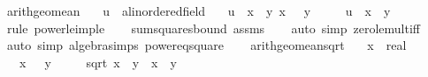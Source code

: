 \begin{isabellebody}
\isanewline
{}\isamarkupfalse%
\ arith{\isacharunderscore}{\kern0pt}geo{\isacharunderscore}{\kern0pt}mean{\isacharcolon}{\kern0pt}\isanewline
\ \ \ u\ {\isacharcolon}{\kern0pt}{\isacharcolon}{\kern0pt}\ {\isachardoublequoteopen}{\isacharprime}{\kern0pt}a{\isacharcolon}{\kern0pt}{\isacharcolon}{\kern0pt}linordered{\isacharunderscore}{\kern0pt}field{\isachardoublequoteclose}\isanewline
\ \ \ {\isachardoublequoteopen}u\ {\isacharequal}{\kern0pt}\ x\ {\isacharasterisk}{\kern0pt}\ y{\isachardoublequoteclose}\ {\isachardoublequoteopen}x\ {\isasymge}\ {}{\isachardoublequoteclose}\ {\isachardoublequoteopen}y\ {\isasymge}\ {}{\isachardoublequoteclose}\isanewline
\ \ \ {\isachardoublequoteopen}u\ {\isasymle}\ {\isacharparenleft}{\kern0pt}x\ {\isacharplus}{\kern0pt}\ y{\isacharparenright}{\kern0pt}{\isacharslash}{\kern0pt}{}{\isachardoublequoteclose}\isanewline
%
\isadelimproof
\ \ %
\endisadelimproof
%
\isatagproof
{}\isamarkupfalse%
\ {\isacharparenleft}{\kern0pt}rule\ power{}{\isacharunderscore}{\kern0pt}le{\isacharunderscore}{\kern0pt}imp{\isacharunderscore}{\kern0pt}le{\isacharparenright}{\kern0pt}\isanewline
\ \ \isamarkupfalse%
\ sum{\isacharunderscore}{\kern0pt}squares{\isacharunderscore}{\kern0pt}bound\ assms\isanewline
\ \ \isamarkupfalse%
\ {\isacharparenleft}{\kern0pt}auto\ simp{\isacharcolon}{\kern0pt}\ zero{\isacharunderscore}{\kern0pt}le{\isacharunderscore}{\kern0pt}mult{\isacharunderscore}{\kern0pt}iff{\isacharparenright}{\kern0pt}\isanewline
\ \ \isamarkupfalse%
\ {\isacharparenleft}{\kern0pt}auto\ simp{\isacharcolon}{\kern0pt}\ algebra{\isacharunderscore}{\kern0pt}simps\ power{}{\isacharunderscore}{\kern0pt}eq{\isacharunderscore}{\kern0pt}square{\isacharparenright}{\kern0pt}\isanewline
\ \ \isamarkupfalse%
%
\endisatagproof
{\isafoldproof}%
%
\isadelimproof
\isanewline
%
\endisadelimproof
\isanewline
{}\isamarkupfalse%
\ arith{\isacharunderscore}{\kern0pt}geo{\isacharunderscore}{\kern0pt}mean{\isacharunderscore}{\kern0pt}sqrt{\isacharcolon}{\kern0pt}\isanewline
\ \ \ x\ {\isacharcolon}{\kern0pt}{\isacharcolon}{\kern0pt}\ real\isanewline
\ \ \ {\isachardoublequoteopen}x\ {\isasymge}\ {}{\isachardoublequoteclose}\ {\isachardoublequoteopen}y\ {\isasymge}\ {}{\isachardoublequoteclose}\isanewline
\ \ \ {\isachardoublequoteopen}sqrt\ {\isacharparenleft}{\kern0pt}x\ {\isacharasterisk}{\kern0pt}\ y{\isacharparenright}{\kern0pt}\ {\isasymle}\ {\isacharparenleft}{\kern0pt}x\ {\isacharplus}{\kern0pt}\ y{\isacharparenright}{\kern0pt}{\isacharslash}{\kern0pt}{}{\isachardoublequoteclose}\isanewline

\end{isabellebody}
